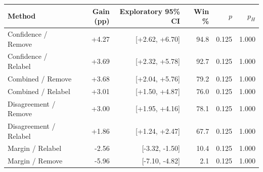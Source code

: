 \begin{tabular}{lrrrrr}
\toprule
Method & Gain (pp) & Exploratory 95\% CI & Win \% & $p$ & $p_H$ \\
\midrule
Confidence / Remove & +4.27 & [+2.62, +6.70] & 94.8 & 0.125 & 1.000 \\
Confidence / Relabel & +3.69 & [+2.32, +5.78] & 92.7 & 0.125 & 1.000 \\
Combined / Remove & +3.68 & [+2.04, +5.76] & 79.2 & 0.125 & 1.000 \\
Combined / Relabel & +3.01 & [+1.50, +4.87] & 76.0 & 0.125 & 1.000 \\
Disagreement / Remove & +3.00 & [+1.95, +4.16] & 78.1 & 0.125 & 1.000 \\
Disagreement / Relabel & +1.86 & [+1.24, +2.47] & 67.7 & 0.125 & 1.000 \\
Margin / Relabel & -2.56 & [-3.32, -1.50] & 10.4 & 0.125 & 1.000 \\
Margin / Remove & -5.96 & [-7.10, -4.82] & 2.1 & 0.125 & 1.000 \\
\bottomrule
\end{tabular}
